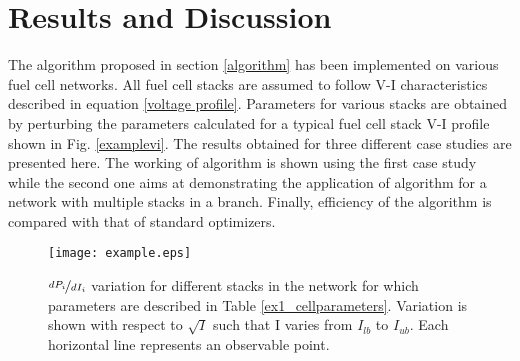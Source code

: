 \documentclass[twocolumn]{autart}
\begin{document}
\section{Results and Discussion}
The algorithm proposed in section \ref{algorithm} has been implemented on various fuel cell networks. All fuel cell stacks are assumed to follow V-I characteristics described in equation \eqref{voltage profile}. Parameters for various stacks are obtained by perturbing the parameters calculated for a typical fuel cell stack V-I profile shown in Fig. \ref{examplevi}. The results obtained for three different case studies are presented here. The working of algorithm is shown using the first case study while the second one aims at demonstrating the application of algorithm for a network with multiple stacks in a branch. Finally, efficiency of the algorithm is compared with that of standard optimizers. 
\begin{figure*}[htbp]
\centering
\texttt{[image: example.eps]}
\caption{$\nicefrac{dP_i}{dI_i}$ variation for different stacks in the network for which parameters are described in Table \ref{ex1_cellparameters}. Variation is shown with respect to $\sqrt{I}$ such that I varies from $I_{lb}$ to $I_{ub}$. Each horizontal line represents an observable point.}
\label{ex1_dpdicurve}
\end{figure*}
\end{document}
